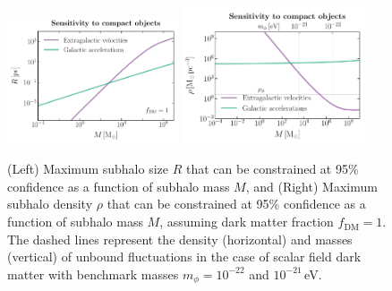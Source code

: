 \documentclass[twocolumn]{aastex63}
\begin{document}


\begin{figure}[htbp]
  \centering
  \includegraphics[width=0.45\textwidth]{plots/compact_M_vs_R}
  \includegraphics[width=0.48\textwidth]{plots/compact_M_vs_rho}
  \caption{(Left) Maximum subhalo size $R$ that can be constrained at 95\% confidence as a function of subhalo mass $M$, and (Right) Maximum subhalo density $\rho$ that can be constrained at 95\% confidence as a function of subhalo mass $M$, assuming dark matter fraction $f_\mathrm{DM}=1$. The dashed lines represent the density (horizontal) and masses (vertical) of unbound fluctuations in the case of scalar field dark matter with benchmark masses $m_\phi = 10^{-22}$ and $10^{-21}$\,eV.} 
  \label{fig:compact_sens}
\end{figure}
\end{document}
